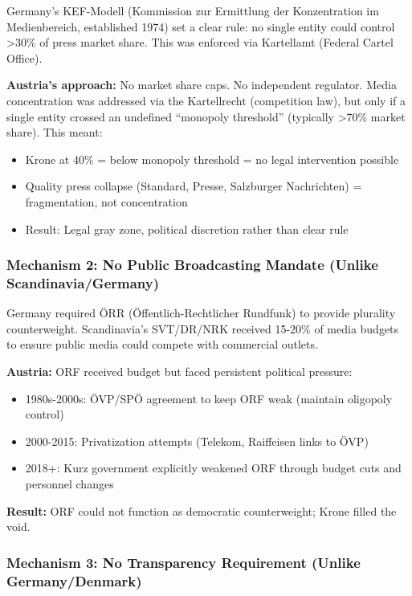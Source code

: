 {Germany's KEF-Modell (Kommission zur Ermittlung der Konzentration im Medienbereich, established 1974)
set a clear rule: no single entity could control >30\% of press market share. This was enforced via
Kartellamt (Federal Cartel Office).

\textbf{Austria's approach:} No market share caps. No independent regulator. Media concentration was
addressed via the Kartellrecht (competition law), but only if a single entity crossed an undefined
``monopoly threshold'' (typically >70\% market share). This meant:

\begin{itemize}
\item Krone at 40\% = below monopoly threshold = no legal intervention possible
\item Quality press collapse (Standard, Presse, Salzburger Nachrichten) = fragmentation, not concentration
\item Result: Legal gray zone, political discretion rather than clear rule
\end{itemize}

\subsubsection*{Mechanism 2: No Public Broadcasting Mandate (Unlike Scandinavia/Germany)}

Germany required ÖRR (Öffentlich-Rechtlicher Rundfunk) to provide plurality counterweight. Scandinavia's
SVT/DR/NRK received 15-20\% of media budgets to ensure public media could compete with commercial outlets.

\textbf{Austria:} ORF received budget but faced persistent political pressure:
\begin{itemize}
\item 1980s-2000s: ÖVP/SPÖ agreement to keep ORF weak (maintain oligopoly control)
\item 2000-2015: Privatization attempts (Telekom, Raiffeisen links to ÖVP)
\item 2018+: Kurz government explicitly weakened ORF through budget cuts and personnel changes
\end{itemize}

\textbf{Result:} ORF could not function as democratic counterweight; Krone filled the void.

\subsubsection*{Mechanism 3: No Transparency Requirement (Unlike Germany/Denmark)}

}
